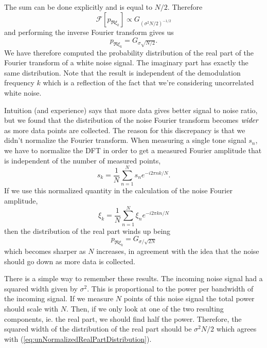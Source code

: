 The sum can be done explicitly and is equal to $N/2$.
Therefore \begin{equation}
\mathcal{F}\left[p_{\Re\xi_{k}}\right]\propto G_{\left(\sigma^{2}N/2\right)^{-1/2}}\end{equation}
and performing the inverse Fourier transform gives us\begin{equation}
p_{\Re\xi_{k}}=G_{\sigma\sqrt{N/2}} . \label{eq:unNormalizedRealPartDistribution} \end{equation}
We have therefore computed the probability distribution of the real part of the Fourier transform of a white noise signal.
The imaginary part has exactly the same distribution.
Note that the result is independent of the demodulation frequency $k$ which is a reflection of the fact that we're considering uncorrelated white noise.

Intuition (and experience) says that more data gives better signal to noise ratio, but we found that the distribution of the noise Fourier transform becomes $\emph{wider}$ as more data points are collected.
The reason for this discrepancy is that we didn't normalize the Fourier transform.
When measuring a single tone signal $s_{n}$, we have to normalize the DFT in order to get a measured Fourier amplitude that is independent of the number of measured points, \begin{equation}
s_{k}=\frac{1}{N}\sum_{n=1}^{N}s_{n}e^{-i2\pi nk/N} . \end{equation}
If we use this normalized quantity in the calculation of the noise Fourier amplitude,\begin{equation}
\xi_{k}=\frac{1}{N}\sum_{n=1}^{N}\xi_{n}e^{-i2\pi kn/N}\end{equation}
then the distribution of the real part winds up being\begin{equation}
p_{\Re\xi_{k}}=G_{\sigma / \sqrt{2N}}\label{eq:normalizedRealPartDistribution}\end{equation}
which becomes sharper as $N$ increases, in agreement with the idea that the noise should go down as more data is collected.

There is a simple way to remember these results.
The incoming noise signal had a squared width given by $\sigma^{2}$.
This is proportional to the power per bandwidth of the incoming signal.
If we measure $N$ points of this noise signal the total power should scale with $N$.
Then, if we only look at one of the two resulting components, ie. the real part, we should find half the power.
Therefore, the squared width of the distribution of the real part should be $\sigma^{2}N/2$ which agrees with (\ref{eq:unNormalizedRealPartDistribution}). 

